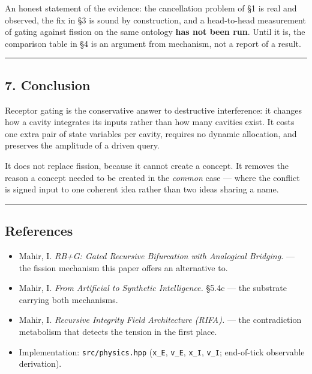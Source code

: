 \documentclass[
  11pt,
  a4paper,
]{article}
\providecommand{\tightlist}{%
  \setlength{\itemsep}{0pt}\setlength{\parskip}{0pt}}
\begin{document}
An honest statement of the evidence: the cancellation problem of §1 is
real and observed, the fix in §3 is sound by construction, and a
head-to-head measurement of gating against fission on the same ontology
\textbf{has not been run}. Until it is, the comparison table in §4 is an
argument from mechanism, not a report of a result.

\begin{center}\rule{0.5\linewidth}{0.5pt}\end{center}

\subsection{7. Conclusion}\label{conclusion}

Receptor gating is the conservative answer to destructive interference:
it changes how a cavity integrates its inputs rather than how many
cavities exist. It costs one extra pair of state variables per cavity,
requires no dynamic allocation, and preserves the amplitude of a driven
query.

It does not replace fission, because it cannot create a concept. It
removes the reason a concept needed to be created in the \emph{common}
case --- where the conflict is signed input to one coherent idea rather
than two ideas sharing a name.

\begin{center}\rule{0.5\linewidth}{0.5pt}\end{center}

\subsection{References}\label{references}

\begin{itemize}
\tightlist
\item
  Mahir, I. \emph{RB+G: Gated Recursive Bifurcation with Analogical
  Bridging.} --- the fission mechanism this paper offers an alternative
  to.
\item
  Mahir, I. \emph{From Artificial to Synthetic Intelligence.} §5.4c ---
  the substrate carrying both mechanisms.
\item
  Mahir, I. \emph{Recursive Integrity Field Architecture (RIFA).} ---
  the contradiction metabolism that detects the tension in the first
  place.
\item
  Implementation: \texttt{src/physics.hpp} (\texttt{x\_E},
  \texttt{v\_E}, \texttt{x\_I}, \texttt{v\_I}; end-of-tick observable
  derivation).
\end{itemize}
\end{document}
